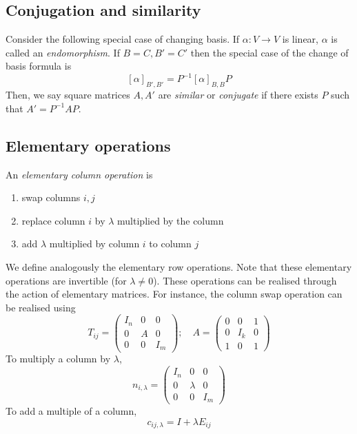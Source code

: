 \subsection{Conjugation and similarity}
Consider the following special case of changing basis.
If \( \alpha \colon V \to V \) is linear, \( \alpha \) is called an \textit{endomorphism}.
If \( B = C, B' = C' \) then the special case of the change of basis formula is
\[
	[\alpha]_{B',B'} = P^{-1} [\alpha]_{B,B} P
\]
Then, we say square matrices \( A, A' \) are \textit{similar} or \textit{conjugate} if there exists \( P \) such that \( A' = P^{-1} A P \).

\subsection{Elementary operations}
\begin{definition}
	An \textit{elementary column operation} is
	\begin{enumerate}
		\item swap columns \( i, j \)
		\item replace column \( i \) by \( \lambda \) multiplied by the column
		\item add \( \lambda \) multiplied by column \( i \) to column \( j \)
	\end{enumerate}
\end{definition}
We define analogously the elementary row operations.
Note that these elementary operations are invertible (for \( \lambda \neq 0 \)).
These operations can be realised through the action of elementary matrices.
For instance, the column swap operation can be realised using
\[
	T_{ij} = \begin{pmatrix}
		I_n & 0 & 0   \\
		0   & A & 0   \\
		0   & 0 & I_m
	\end{pmatrix};\quad A = \begin{pmatrix}
		0 & 0   & 1 \\
		0 & I_k & 0 \\
		1 & 0   & 1
	\end{pmatrix}
\]
To multiply a column by \( \lambda \),
\[
	n_{i,\lambda} = \begin{pmatrix}
		I_n & 0       & 0   \\
		0   & \lambda & 0   \\
		0   & 0       & I_m
	\end{pmatrix}
\]
To add a multiple of a column,
\[
	c_{ij,\lambda} = I + \lambda E_{ij}
\]

